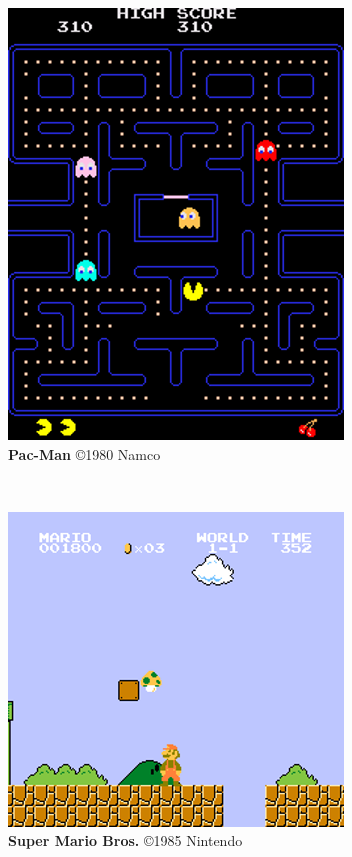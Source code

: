 \expandafter\documentclass\expandafter[table, usenames, svgnames, dvipsnames, \classopts]{beamer}
\begin{document}
\begin{frame}
\begin{figure}
	    \begin{subfigure}[!h]{0.25\paperwidth}
	    	\centering
	    	\includegraphics[height=0.22\paperheight]{pacman-screenshot}
	        \caption{\scriptsize\textbf{Pac-Man} \copyright{1980} Namco\footnotemark{}}
	    \end{subfigure}
	    ~
		\begin{subfigure}[!h]{0.25\paperwidth}
			\centering
	        \includegraphics[height=0.2\paperheight]{supermario-screenshot}
	        \caption{\scriptsize\textbf{Super Mario Bros.} \copyright{1985} Nintendo\footnotemark{}}
	    \end{subfigure}
	   	~
	    \begin{subfigure}[!h]{0.25\paperwidth}
	    	\centering

\end{subfigure}
\end{figure}
\end{frame}
\end{document}
